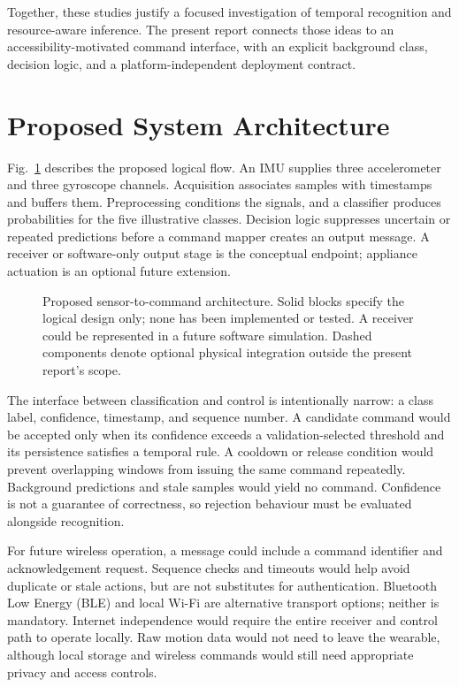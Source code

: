 \documentclass[conference]{IEEEtran}
\begin{document}
Together, these studies justify a focused investigation of temporal recognition and resource-aware inference. The present report connects those ideas to an accessibility-motivated command interface, with an explicit background class, decision logic, and a platform-independent deployment contract.

\section{Proposed System Architecture}
Fig.~\ref{fig:architecture} describes the proposed logical flow. An IMU supplies three accelerometer and three gyroscope channels. Acquisition associates samples with timestamps and buffers them. Preprocessing conditions the signals, and a classifier produces probabilities for the five illustrative classes. Decision logic suppresses uncertain or repeated predictions before a command mapper creates an output message. A receiver or software-only output stage is the conceptual endpoint; appliance actuation is an optional future extension.

\begin{figure}[t]
\centering

\caption{Proposed sensor-to-command architecture. Solid blocks specify the logical design only; none has been implemented or tested. A receiver could be represented in a future software simulation. Dashed components denote optional physical integration outside the present report's scope.}
\label{fig:architecture}
\end{figure}

The interface between classification and control is intentionally narrow: a class label, confidence, timestamp, and sequence number. A candidate command would be accepted only when its confidence exceeds a validation-selected threshold and its persistence satisfies a temporal rule. A cooldown or release condition would prevent overlapping windows from issuing the same command repeatedly. Background predictions and stale samples would yield no command. Confidence is not a guarantee of correctness, so rejection behaviour must be evaluated alongside recognition.

For future wireless operation, a message could include a command identifier and acknowledgement request. Sequence checks and timeouts would help avoid duplicate or stale actions, but are not substitutes for authentication. Bluetooth Low Energy (BLE) and local Wi-Fi are alternative transport options; neither is mandatory. Internet independence would require the entire receiver and control path to operate locally. Raw motion data would not need to leave the wearable, although local storage and wireless commands would still need appropriate privacy and access controls.
\end{document}
